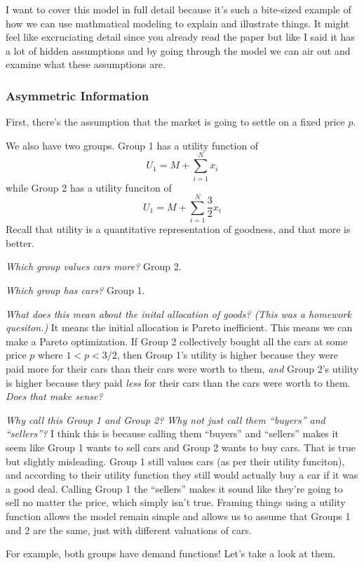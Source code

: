 \documentclass[11pt]{article}
\begin{document}
I want to cover this model in full detail because it's such a bite-sized example of how we can use mathmatical modeling to explain and illustrate things. It might feel like excruciating detail since you already read the paper but like I said it has a lot of hidden assumptions and by going through the model we can air out and examine what these assumptions are.


\subsubsection{Asymmetric Information}

First, there's the assumption that the market is going to settle on a fixed price $p$. 


We also have two groups. Group 1 has a utility function of 
$$U_1 = M + \sum_{i=1}^N x_i$$
while Group 2 has a utility funciton of 
$$U_1 = M + \sum_{i=1}^N \frac{3}{2}x_i$$
Recall that utility is a quantitative representation of goodness, and that more is better. 

{\it Which group values cars more?} Group 2.

{\it Which group has cars?} Group 1.

{\it What does this mean about the inital allocation of goods? (This was a homework quesiton.)} It means the initial allocation is Pareto inefficient. This means we can make a Pareto optimization. If Group 2 collectively bought all the cars at some price $p$ where $1 < p < 3/2$, then Group 1's utility is higher because they were paid more for their cars than their cars were worth to them, {\it and} Group 2's utility is higher because they paid {\it less} for their cars than the cars were worth to them. {\it Does that make sense?}

{\it Why call this Group 1 and Group 2? Why not just call them ``buyers'' and ``sellers''?} I think this is because calling them ``buyers'' and ``sellers'' makes it seem like Group 1 wants to sell cars and Group 2 wants to buy cars. That is true but slightly misleading. Group 1 still values cars (as per their utility funciton), and according to their utility function they still would actually buy a car if it was a good deal. Calling Group 1 the ``sellers'' makes it sound like they're going to sell no matter the price, which simply isn't true. Framing things using a utility function allows the model remain simple and allows us to assume that Groups 1 and 2 are the same, just with different valuations of cars.

For example, both groups have demand functions! Let's take a look at them.
\end{document}
